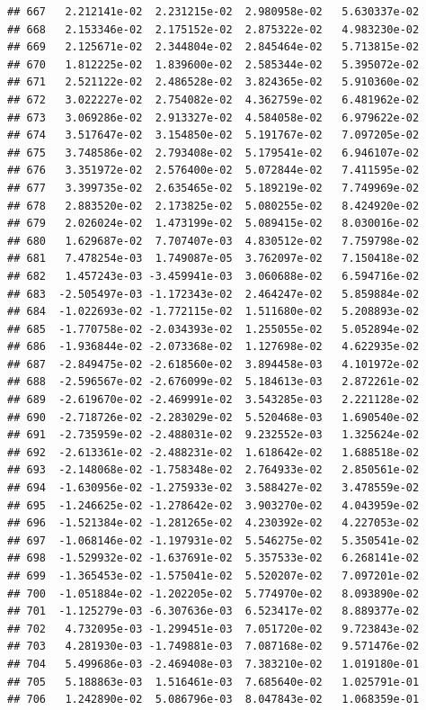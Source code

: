 \documentclass[
]{article}
\begin{document}
\begin{verbatim}
## 667   2.212141e-02  2.231215e-02  2.980958e-02   5.630337e-02
## 668   2.153346e-02  2.175152e-02  2.875322e-02   4.983230e-02
## 669   2.125671e-02  2.344804e-02  2.845464e-02   5.713815e-02
## 670   1.812225e-02  1.839600e-02  2.585344e-02   5.395072e-02
## 671   2.521122e-02  2.486528e-02  3.824365e-02   5.910360e-02
## 672   3.022227e-02  2.754082e-02  4.362759e-02   6.481962e-02
## 673   3.069286e-02  2.913327e-02  4.584058e-02   6.979622e-02
## 674   3.517647e-02  3.154850e-02  5.191767e-02   7.097205e-02
## 675   3.748586e-02  2.793408e-02  5.179541e-02   6.946107e-02
## 676   3.351972e-02  2.576400e-02  5.072844e-02   7.411595e-02
## 677   3.399735e-02  2.635465e-02  5.189219e-02   7.749969e-02
## 678   2.883520e-02  2.173825e-02  5.080255e-02   8.424920e-02
## 679   2.026024e-02  1.473199e-02  5.089415e-02   8.030016e-02
## 680   1.629687e-02  7.707407e-03  4.830512e-02   7.759798e-02
## 681   7.478254e-03  1.749087e-05  3.762097e-02   7.150418e-02
## 682   1.457243e-03 -3.459941e-03  3.060688e-02   6.594716e-02
## 683  -2.505497e-03 -1.172343e-02  2.464247e-02   5.859884e-02
## 684  -1.022693e-02 -1.772115e-02  1.511680e-02   5.208893e-02
## 685  -1.770758e-02 -2.034393e-02  1.255055e-02   5.052894e-02
## 686  -1.936844e-02 -2.073368e-02  1.127698e-02   4.622935e-02
## 687  -2.849475e-02 -2.618560e-02  3.894458e-03   4.101972e-02
## 688  -2.596567e-02 -2.676099e-02  5.184613e-03   2.872261e-02
## 689  -2.619670e-02 -2.469991e-02  3.543285e-03   2.221128e-02
## 690  -2.718726e-02 -2.283029e-02  5.520468e-03   1.690540e-02
## 691  -2.735959e-02 -2.488031e-02  9.232552e-03   1.325624e-02
## 692  -2.613361e-02 -2.488231e-02  1.618642e-02   1.688518e-02
## 693  -2.148068e-02 -1.758348e-02  2.764933e-02   2.850561e-02
## 694  -1.630956e-02 -1.275933e-02  3.588427e-02   3.478559e-02
## 695  -1.246625e-02 -1.278642e-02  3.903270e-02   4.043959e-02
## 696  -1.521384e-02 -1.281265e-02  4.230392e-02   4.227053e-02
## 697  -1.068146e-02 -1.197931e-02  5.546275e-02   5.350541e-02
## 698  -1.529932e-02 -1.637691e-02  5.357533e-02   6.268141e-02
## 699  -1.365453e-02 -1.575041e-02  5.520207e-02   7.097201e-02
## 700  -1.051884e-02 -1.202205e-02  5.774970e-02   8.093890e-02
## 701  -1.125279e-03 -6.307636e-03  6.523417e-02   8.889377e-02
## 702   4.732095e-03 -1.299451e-03  7.051720e-02   9.723843e-02
## 703   4.281930e-03 -1.749881e-03  7.087168e-02   9.571476e-02
## 704   5.499686e-03 -2.469408e-03  7.383210e-02   1.019180e-01
## 705   5.188863e-03  1.516461e-03  7.685640e-02   1.025791e-01
## 706   1.242890e-02  5.086796e-03  8.047843e-02   1.068359e-01

\end{verbatim}
\end{document}
